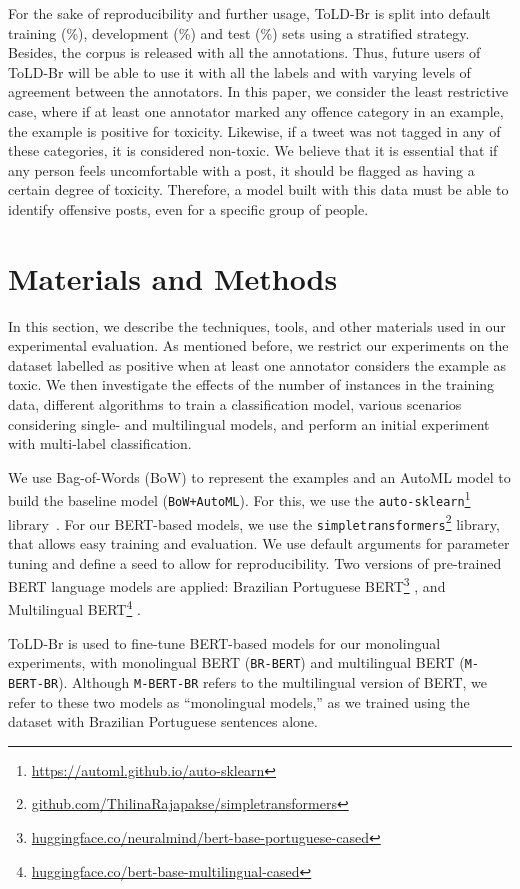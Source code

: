\documentclass[11pt,a4paper]{article}
\begin{document}
For the sake of reproducibility and further usage, ToLD-Br is split into default training (\%), development (\%) and test (\%) sets using a stratified strategy. Besides, the corpus is released with all the annotations. Thus, future users of ToLD-Br will be able to use it with all the labels and with varying levels of agreement between the annotators. In this paper, we consider the least restrictive case, where if at least one annotator marked any offence category in an example, the example is positive for toxicity. Likewise, if a tweet was not tagged in any of these categories, it is considered non-toxic. We believe that it is essential that if any person feels uncomfortable with a post, it should be flagged as having a certain degree of toxicity. Therefore, a model built with this data must be able to identify offensive posts, even for a specific group of people.

\section{Materials and Methods} \label{sec:materials}


In this section, we describe the techniques, tools, and other materials used in our experimental evaluation. As mentioned before, we restrict our experiments on the dataset labelled as positive when at least one annotator considers the example as toxic. We then investigate the effects of the number of instances in the training data, different algorithms to train a classification model, various scenarios considering single- and multilingual models, and perform an initial experiment with multi-label classification. 

We use Bag-of-Words (BoW) to represent the examples and an AutoML model to build the baseline model (\texttt{BoW+AutoML}). For this, we use the \texttt{auto-sklearn}\footnote{\url{https://automl.github.io/auto-sklearn}} library~\cite{feurer2019auto}. For our BERT-based models, we use the \texttt{simpletransformers}\footnote{\url{github.com/ThilinaRajapakse/simpletransformers}} library, that allows easy training and evaluation. We use default arguments for parameter tuning and define a seed to allow for reproducibility. Two versions of pre-trained BERT language models are applied: Brazilian Portuguese BERT\footnote{\url{huggingface.co/neuralmind/bert-base-portuguese-cased}} \cite{souza2019portuguese}, and Multilingual BERT\footnote{\url{huggingface.co/bert-base-multilingual-cased}} \cite{Wolf2019HuggingFacesTS}.

ToLD-Br is used to fine-tune BERT-based models for our monolingual experiments, with monolingual BERT (\texttt{BR-BERT}) and multilingual BERT (\texttt{M-BERT-BR}). Although \texttt{M-BERT-BR} refers to the multilingual version of BERT, we refer to these two models as ``monolingual models,'' as we trained using the dataset with Brazilian Portuguese sentences alone.
\end{document}

